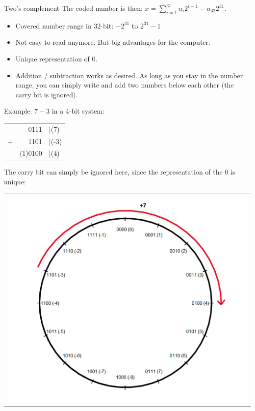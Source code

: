\documentclass[11pt,compress,t,notes=noshow, xcolor=table]{beamer}
\begin{document}
\begin{vbframe}{Two's complement}
The coded number is then: $x = \sum_{i=1}^{31} u_i 2^{i-1} - u_{32} 2^{31}$.

\framebreak
\begin{itemize}
\item Covered number range in 32-bit: $-2^{31}$ to $2^{31} - 1$
\item Not easy to read anymore. But big advantages for the computer.
\item Unique representation of $0$.
\item Addition / subtraction works as desired. As long as you stay in the number range, you can simply write and add two numbers below each other (the carry bit is ignored).
\end{itemize}
Example: $7 - 3$ in a 4-bit system:


\begin{center}
  \begin{tabular}{crl}
    &0111  &|(7)\\
    +&1101  &|(-3)\\\hline
    &(1)0100&|(4)
  \end{tabular}
\end{center}

\framebreak
The carry bit can simply be ignored here, since the representation of the $0$ is unique:

\vspace{-0.5cm}
\begin{center}
\begin{tabular}{l}
\includegraphics[width=0.4\paperwidth]{figure_man/2complement}
\end{tabular}
\end{center}


\end{vbframe}
\end{document}
